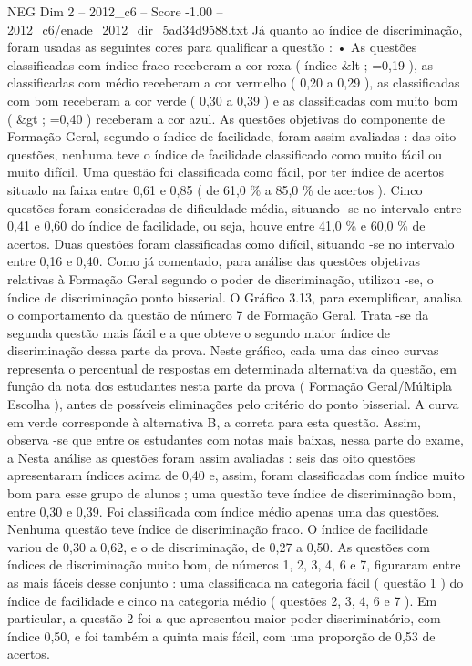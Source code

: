 \begin{textsample}{NEG Dim 2 – 2012\_c6 – Score -1.00 – 2012\_c6/enade\_2012\_dir\_5ad34d9588.txt}
Já quanto ao índice de discriminação, foram usadas as seguintes cores para qualificar a questão : • As questões classificadas com índice fraco receberam a cor roxa ( índice \&lt ; =0,19 ), as classificadas com médio receberam a cor vermelho ( 0,20 a 0,29 ), as classificadas com bom receberam a cor verde ( 0,30 a 0,39 ) e as classificadas com muito bom ( \&gt ; =0,40 ) receberam a cor azul.
As questões objetivas do componente de Formação Geral, segundo o índice de facilidade, foram assim avaliadas : das oito questões, nenhuma teve o índice de facilidade classificado como muito fácil ou muito difícil.
Uma questão foi classificada como fácil, por ter índice de acertos situado na faixa entre 0,61 e 0,85 ( de 61,0 \% a 85,0 \% de acertos ).
Cinco questões foram consideradas de dificuldade média, situando -se no intervalo entre 0,41 e 0,60 do índice de facilidade, ou seja, houve entre 41,0 \% e 60,0 \% de acertos.
Duas questões foram classificadas como difícil, situando -se no intervalo entre 0,16 e 0,40.
Como já comentado, para análise das questões objetivas relativas à Formação Geral segundo o poder de discriminação, utilizou -se, o índice de discriminação ponto bisserial.
O Gráfico 3.13, para exemplificar, analisa o comportamento da questão de número 7 de Formação Geral.
Trata -se da segunda questão mais fácil e a que obteve o segundo maior índice de discriminação dessa parte da prova.
Neste gráfico, cada uma das cinco curvas representa o percentual de respostas em determinada alternativa da questão, em função da nota dos estudantes nesta parte da prova ( Formação Geral/Múltipla Escolha ), antes de possíveis eliminações pelo critério do ponto bisserial.
A curva em verde corresponde à alternativa B, a correta para esta questão.
Assim, observa -se que entre os estudantes com notas mais baixas, nessa parte do exame, a Nesta análise as questões foram assim avaliadas : seis das oito questões apresentaram índices acima de 0,40 e, assim, foram classificadas com índice muito bom para esse grupo de alunos ; uma questão teve índice de discriminação bom, entre 0,30 e 0,39.
Foi classificada com índice médio apenas uma das questões.
Nenhuma questão teve índice de discriminação fraco.
O índice de facilidade variou de 0,30 a 0,62, e o de discriminação, de 0,27 a 0,50.
As questões com índices de discriminação muito bom, de números 1, 2, 3, 4, 6 e 7, figuraram entre as mais fáceis desse conjunto : uma classificada na categoria fácil ( questão 1 ) do índice de facilidade e cinco na categoria médio ( questões 2, 3, 4, 6 e 7 ).
Em particular, a questão 2 foi a que apresentou maior poder discriminatório, com índice 0,50, e foi também a quinta mais fácil, com uma proporção de 0,53 de acertos.

\end{textsample}
